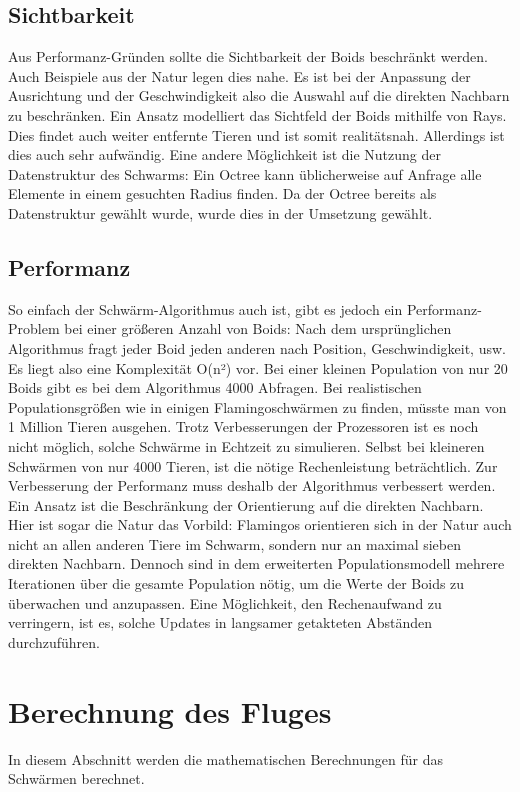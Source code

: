 \documentclass[draft=false
              ,paper=a4
              ,twoside=false
              ,fontsize=11pt
              ,headsepline
              ,BCOR10mm
              ,DIV11
              ,bibtotoc
              ,liststotoc
              ]{scrbook}
\begin{document}
\subsection{Sichtbarkeit}
Aus Performanz-Gründen sollte die Sichtbarkeit der Boids beschränkt werden. Auch Beispiele aus der Natur legen dies nahe. Es ist bei der Anpassung der Ausrichtung und der Geschwindigkeit also die Auswahl auf die direkten Nachbarn zu beschränken. Ein Ansatz modelliert das Sichtfeld der Boids mithilfe von Rays. Dies findet auch weiter entfernte Tieren und ist somit realitätsnah. Allerdings ist dies auch sehr aufwändig. Eine andere Möglichkeit ist die Nutzung der Datenstruktur des Schwarms: Ein Octree kann üblicherweise auf Anfrage alle Elemente in einem gesuchten Radius finden. Da der Octree bereits als Datenstruktur gewählt wurde, wurde dies in der Umsetzung gewählt.
\subsection{Performanz}
So einfach der Schwärm-Algorithmus auch ist, gibt es jedoch ein Performanz-Problem bei einer größeren Anzahl von Boids: Nach dem ursprünglichen Algorithmus fragt jeder Boid jeden anderen nach Position, Geschwindigkeit, usw. Es liegt also eine Komplexität O(n²) vor. Bei einer kleinen Population von nur 20 Boids gibt es bei dem Algorithmus 4000 Abfragen. Bei realistischen Populationsgrößen wie in einigen Flamingoschwärmen zu finden, müsste man von 1 Million Tieren ausgehen. Trotz Verbesserungen der Prozessoren ist es noch nicht möglich, solche Schwärme in Echtzeit zu simulieren. Selbst bei kleineren Schwärmen von nur 4000 Tieren, ist die nötige Rechenleistung beträchtlich. Zur Verbesserung der Performanz muss deshalb der Algorithmus verbessert werden. Ein Ansatz ist die Beschränkung der Orientierung auf die direkten Nachbarn. Hier ist sogar die Natur das Vorbild: Flamingos orientieren sich in der Natur auch nicht an allen anderen Tiere im Schwarm, sondern nur an maximal sieben direkten Nachbarn.
Dennoch sind in dem erweiterten Populationsmodell mehrere Iterationen über die gesamte Population nötig, um die Werte der Boids zu überwachen und anzupassen. Eine Möglichkeit, den Rechenaufwand zu verringern, ist es, solche Updates in langsamer getakteten Abständen durchzuführen.

\section{Berechnung des Fluges}
In diesem Abschnitt werden die mathematischen Berechnungen für das Schwärmen berechnet.
\end{document}
